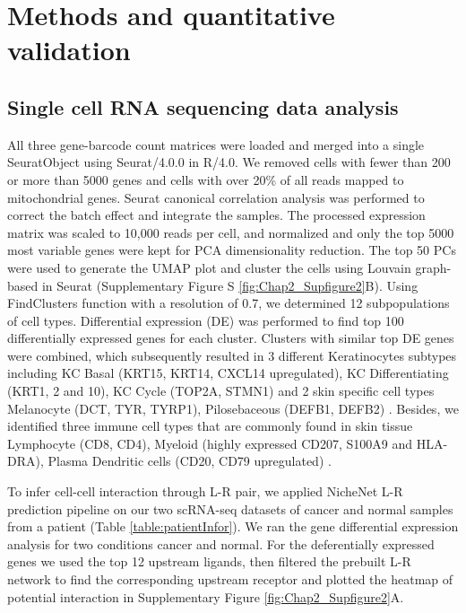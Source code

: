 \section{Methods and quantitative validation}
\label{Sec:2.3_validation}	%
\subsection{Single cell RNA sequencing data analysis}
All three gene-barcode count matrices were loaded and merged into a single SeuratObject using Seurat/4.0.0 in R/4.0. We removed cells with fewer than 200 or more than 5000 genes and cells with over 20\% of all reads mapped to mitochondrial genes. Seurat canonical correlation analysis was performed to correct the batch effect and integrate the samples. The processed expression matrix was scaled to 10,000 reads per cell, and normalized and only the top 5000 most variable genes were kept for PCA dimensionality reduction. The top 50 PCs were used to generate the UMAP plot and cluster the cells using Louvain graph-based in Seurat (Supplementary Figure S \ref{fig:Chap2_Supfigure2}B). Using FindClusters function with a resolution of 0.7, we determined 12 subpopulations of cell types. Differential expression (DE) was performed to find top 100 differentially expressed genes for each cluster. Clusters with similar top DE genes were combined, which subsequently resulted in 3 different Keratinocytes subtypes including KC Basal (KRT15, KRT14, CXCL14  upregulated), KC Differentiating (KRT1, 2 and 10), KC Cycle (TOP2A, STMN1)  \cite{joost2016single, ji2020multimodal} and 2 skin specific cell types Melanocyte (DCT, TYR, TYRP1), Pilosebaceous (DEFB1, DEFB2) \cite{belote2021human}. Besides, we identified three immune cell types that are commonly found in skin tissue  Lymphocyte (CD8, CD4), Myeloid (highly expressed CD207, S100A9 and HLA-DRA), Plasma Dendritic cells (CD20, CD79 upregulated) \cite{ji2020multimodal}.          

To infer cell-cell interaction through L-R pair, we applied NicheNet L-R prediction pipeline \cite{browaeys2020nichenet} on our two scRNA-seq datasets of cancer and normal samples from a patient (Table \ref{table:patientInfor}). We ran the gene differential expression analysis for two conditions cancer and normal. For the deferentially expressed genes we used the top 12 upstream ligands, then filtered the prebuilt L-R network to find the corresponding upstream receptor and plotted the heatmap of potential interaction in Supplementary Figure \ref{fig:Chap2_Supfigure2}A.
